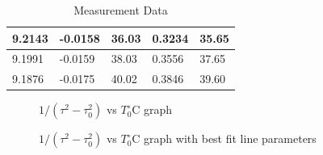 \documentclass[a4paper, 12pt]{article}%
\begin{document}
\begin{table}
\begin{center}
\begin{tabular}{|l|l|l|l|l|}
9.2143                               & -0.0158                            & 36.03            & 0.3234                         & 35.65       \\ \hline
9.1991                               & -0.0159                            & 38.03             & 0.3556                         & 37.65       \\ \hline
9.1876                               & -0.0175                            & 40.02             & 0.3846                         & 39.60       \\ \hline
\end{tabular}
    \caption{Measurement Data}
    \label{data}
\end{center}
\end{table}



\begin{figure}
		\caption{ $1 / (\tau^2 - \tau_0^2)$ vs $T_0^{\circ} \mathrm{C}$ graph}
		\label{ris:ustanovka}
\end{figure} 
\begin{figure}
		\caption{$1 / (\tau^2 - \tau_0^2)$ vs $T_0^{\circ} \mathrm{C}$ graph with best fit line parameters}
		\label{ris:ustanovka}
\end{figure} 
\end{document}
